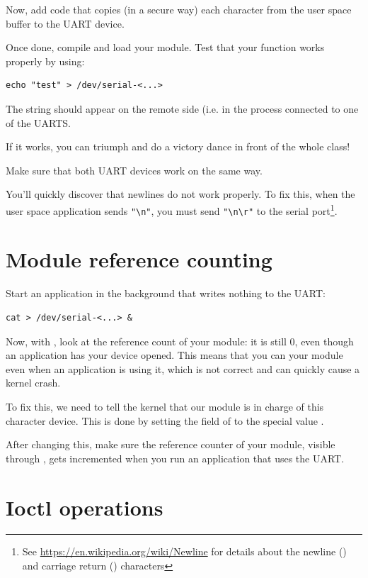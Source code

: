 Now, add code that copies (in a secure way) each character from the
user space buffer to the UART device.

Once done, compile and load your module. Test that your  function
works properly by using:

\begin{verbatim}
echo "test" > /dev/serial-<...>
\end{verbatim}

The  string should appear on the remote side (i.e. in
the  process connected to one of the UARTS.

If it works, you can triumph and do a victory dance in front of the
whole class!

Make sure that both UART devices work on the same way.

You'll quickly discover that newlines do not work properly. To fix
this, when the user space application sends \verb+"\n"+, you must send
\verb+"\n\r"+ to the serial port\footnote{See
\url{https://en.wikipedia.org/wiki/Newline} for details about the
newline (\code{\n}) and carriage return (\code{\r}) characters}.

\section{Module reference counting}

Start an application in the background that writes nothing to the
UART:

\begin{verbatim}
cat > /dev/serial-<...> &
\end{verbatim}

Now, with , look at the reference count of your module: it
is still 0, even though an application has your device opened. This
means that you can  your module even when an application
is using it, which is not correct and can quickly cause a kernel
crash.

To fix this, we need to tell the kernel that our module is in charge
of this character device. This is done by setting the 
field of  to the special value
.

After changing this, make sure the reference counter of your module,
visible through , gets incremented when you run an
application that uses the UART.

\section{Ioctl operations}


